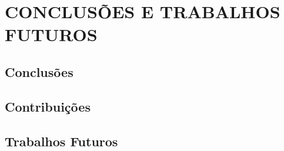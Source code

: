 \section{CONCLUSÕES E TRABALHOS FUTUROS}

\subsection{Conclusões}

\subsection{Contribuições}

\subsection{Trabalhos Futuros}
